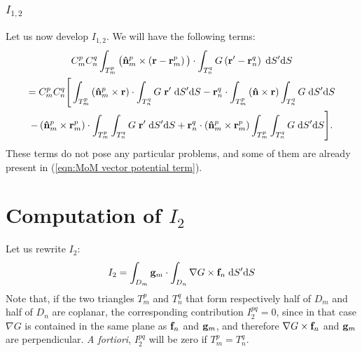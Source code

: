 \subsubsection{$I_{1,2}$}
%
\par
Let us now develop $I_{1,2}$. We will have the following terms:
\begin{multline}
C_m^p C_n^q \int_{T_m^p} \big( \mathbf{\Hat{n}}_m^p \times \left(\mathbf{r} - \mathbf{r}_m^p \right)\big) \cdot \int_{T_n^q} G \left(\mathbf{r}'-\mathbf{r}_n^q \right) \; \text{d} S' \text{d} S \\
= C_m^p C_n^q  \Bigg[\int_{T_m^p} \left(\mathbf{\Hat{n}}_m^p \times \mathbf{r} \right) \cdot \int_{T_n^q} G \; \mathbf{r}' \; \text{d} S' \text{d} S - \mathbf{r}_n^q \cdot \int_{T_m^p} \left(\mathbf{\Hat{n}} \times \mathbf{r} \right) \int_{T_n^q} G \; \text{d} S' \text{d} S \\
- \left(\mathbf{\Hat{n}}_m^p \times \mathbf{r}_m^p\right)  \cdot \int_{T_m^p} \int_{T_n^q} G \; \mathbf{r}'\; \text{d} S' \text{d} S + \mathbf{r}_n^q \cdot \left(\mathbf{\Hat{n}}_m^p \times \mathbf{r}_m^p\right) \int_{T_m^p} \int_{T_n^q} G \; \text{d} S' \text{d} S \Bigg].
\end{multline}
These terms do not pose any particular problems, and some of them are already present in (\ref{eqn:MoM vector potential term}).

\section{Computation of $I_2$}
%
\par
Let us rewrite $I_2$:
\begin{equation} \label{eqn:new expression for I_2}
I_2 = \int_{D_m} \mathbf{g}_m \cdot \int_{D_n} \nabla G \times \mathbf{f}_n \; \text{d} S' \text{d} S 
\end{equation}
Note that, if the two triangles $T_m^p$ and $T_n^q$ that form respectively half of $D_m$ and half of $D_n$ are coplanar, the corresponding contribution $I_2^{pq} = 0$, since in that case $\nabla G$ is contained in the same plane as $\mathbf{f}_n$ and $\mathbf{g}_m$, and therefore $\nabla G \times \mathbf{f}_n$ and $\mathbf{g}_m$ are perpendicular. \textit{A fortiori}, $I_2^{pq}$ will be zero if $T_m^p = T_n^q$.

